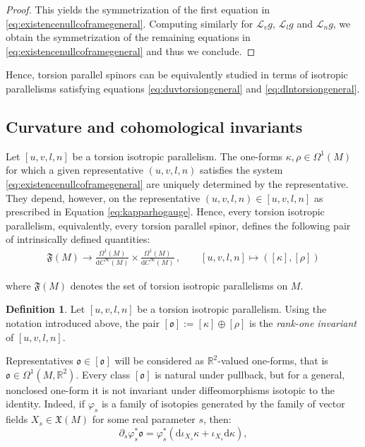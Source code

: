 \documentclass[10pt,reqno,a4paper]{amsart}
\theoremstyle{plain}
\theoremstyle{definition}
\newtheorem{definition}[thm]{Definition}
\theoremstyle{remark}
\theoremstyle{remark}
\def\dd{\mathrm{d}}
\def\cL{\mathcal{L}}
\def\cL{\mathcal{L}}
\renewcommand{\(}{ (}
\renewcommand{\)}{ )}
\begin{document}
\begin{proof}
\noindent
This yields the symmetrization of the first equation in \eqref{eq:existencenullcoframegeneral}. Computing similarly for $\cL_v g$, $\cL_l g$ and $\cL_n g$, we obtain the symmetrization of the remaining equations in \eqref{eq:existencenullcoframegeneral} and thus we conclude. 
\end{proof}
 

 \noindent
 Hence, torsion parallel spinors can be equivalently studied in terms of isotropic parallelisms satisfying equations \eqref{eq:duvtorsiongeneral} and \eqref{eq:dlntorsiongeneral}. 
 
 

%

\subsection{Curvature and cohomological invariants}
\label{sec:generalcurvature}

%

Let $[u,v,l,n]$ be a torsion isotropic parallelism. The one-forms $\kappa,\rho\in \Omega^1(M)$ for which a given representative $(u,v,l,n)$ satisfies the system \eqref{eq:existencenullcoframegeneral} are uniquely determined by the representative. They depend, however, on the representative $(u,v,l,n)\in [u,v,l,n]$ as prescribed in Equation \eqref{eq:kapparhogauge}. Hence, every torsion isotropic parallelism, equivalently, every torsion parallel spinor, defines the following pair of intrinsically defined quantities:
\begin{eqnarray}
\label{eq:class}
\mathfrak{F}(M) \to \frac{\Omega^1(M)}{\dd C^{\infty}(M)}\times \frac{\Omega^1(M)}{\dd C^{\infty}(M)}\, , \qquad [u,v,l,n] \mapsto ([\kappa],[\rho]) 
\end{eqnarray}

\noindent
where $\mathfrak{F}(M)$ denotes the set of torsion isotropic parallelisms on $M$. 

\begin{definition}
Let $[u,v,l,n]$ be a torsion isotropic parallelism. Using the notation introduced above, the pair $[\mathfrak{o}] := [\kappa] \oplus [\rho]$ is the \emph{rank-one invariant} of $[u,v,l,n]$. 
\end{definition}

 \noindent
 Representatives $\mathfrak{o} \in [\mathfrak{o}]$ will be considered as $\mathbb{R}^2$-valued one-forms, that is $\mathfrak{o}\in \Omega^1(M,\mathbb{R}^2)$. Every class $[\mathfrak{o}]$ is natural under pullback, but for a general, nonclosed one-form it is not invariant under diffeomorphisms isotopic to the identity.  Indeed, if $\varphi_s$ is a family of isotopies generated by the family of vector fields $X_{s}\in \mathfrak{X}(M)$ for some real parameter $s$, then:
\begin{equation*}
\partial_s \varphi_s^{\ast}\mathfrak{o} = \varphi_s^{\ast} (\dd\iota_{X_s}\kappa+\iota_{X_s}\dd\kappa ),
\end{equation*}
\end{document}
